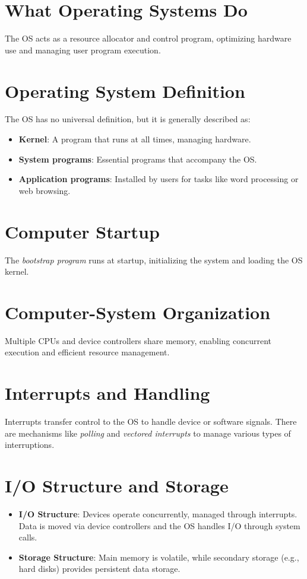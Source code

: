 \documentclass{article}
\begin{document}
\section{What Operating Systems Do}
The OS acts as a resource allocator and control program, optimizing hardware use and managing user program execution.

\section{Operating System Definition}
The OS has no universal definition, but it is generally described as:
\begin{itemize}
    \item \textbf{Kernel}: A program that runs at all times, managing hardware.
    \item \textbf{System programs}: Essential programs that accompany the OS.
    \item \textbf{Application programs}: Installed by users for tasks like word processing or web browsing.
\end{itemize}

\section{Computer Startup}
The \textit{bootstrap program} runs at startup, initializing the system and loading the OS kernel.

\section{Computer-System Organization}
Multiple CPUs and device controllers share memory, enabling concurrent execution and efficient resource management.

\section{Interrupts and Handling}
Interrupts transfer control to the OS to handle device or software signals. There are mechanisms like \textit{polling} and \textit{vectored interrupts} to manage various types of interruptions.

\section{I/O Structure and Storage}
\begin{itemize}
    \item \textbf{I/O Structure}: Devices operate concurrently, managed through interrupts. Data is moved via device controllers and the OS handles I/O through system calls.
    \item \textbf{Storage Structure}: Main memory is volatile, while secondary storage (e.g., hard disks) provides persistent data storage.
\end{itemize}
\end{document}
